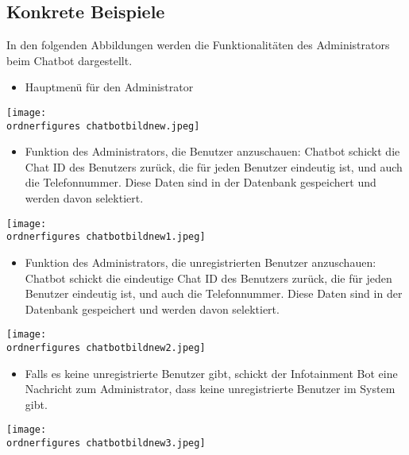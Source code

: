 \subsection{Konkrete Beispiele} 
In den folgenden Abbildungen werden die Funktionalitäten des Administrators beim Chatbot dargestellt.
\begin{itemize}
	\item Hauptmen\"u f\"ur den Administrator
\end{itemize}
\begin{center}
	\captionsetup{type=figure}
	\texttt{[image: \\ordnerfigures chatbotbildnew.jpeg]}
	\caption{Hauptmen\"u f\"ur den Administrator} 
	\label{fig:menuadmin}
\end{center}
\begin{itemize}
	\item Funktion des Administrators, die Benutzer anzuschauen: Chatbot schickt die Chat ID des Benutzers zurück, die für jeden Benutzer eindeutig ist, und auch die Telefonnummer. Diese Daten sind in der Datenbank gespeichert und werden davon selektiert.
\end{itemize}
\begin{center}
	\captionsetup{type=figure}
	\texttt{[image: \\ordnerfigures chatbotbildnew1.jpeg]}
	\caption{Auflistung der Chatbot-Benutzer} 
	\label{fig:chatbotbenutzer}
\end{center}
\begin{itemize}
	\item Funktion des Administrators, die unregistrierten Benutzer anzuschauen: Chatbot schickt die eindeutige Chat ID des Benutzers zurück, die für jeden Benutzer eindeutig ist, und auch die Telefonnummer. Diese Daten sind in der Datenbank gespeichert und werden davon selektiert.
\end{itemize}
\begin{center}
	\captionsetup{type=figure}
	\texttt{[image: \\ordnerfigures chatbotbildnew2.jpeg]}
	\caption{Auflistung der unregistrierten Benutzer}
	\label{chatbotben}
\end{center}
\begin{itemize}
	\item Falls es keine unregistrierte Benutzer gibt, schickt der Infotainment Bot eine Nachricht zum Administrator, dass keine unregistrierte Benutzer im System gibt.
\end{itemize}
\begin{center}
	\captionsetup{type=figure}
	\texttt{[image: \\ordnerfigures chatbotbildnew3.jpeg]}
	\caption{Keine Unregistrierte Benutzer}
	\label{chatbotbenf}
\end{center}
